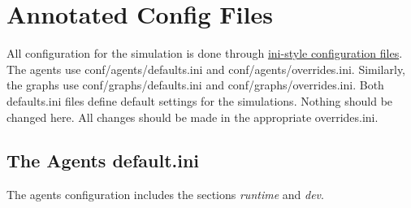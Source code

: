 \documentclass[11pt,letterpaper,onecolumn,twoside,openright,final]{report}
\begin{document}
\chapter{Annotated Config Files}
All configuration for the simulation is done through \href{http://en.wikipedia.org/wiki/INI\_file}{ini-style configuration files}.
The agents use \mbox{conf/agents/defaults.ini} and \mbox{conf/agents/overrides.ini}.
Similarly, the graphs use \mbox{conf/graphs/defaults.ini} and \mbox{conf/graphs/overrides.ini}.
Both \mbox{defaults.ini} files define default settings for the simulations.
Nothing should be changed here.
All changes should be made in the appropriate \mbox{overrides.ini}.

\section{The Agents default.ini}
The agents configuration includes the sections \emph{runtime} and \emph{dev}.
\end{document}

